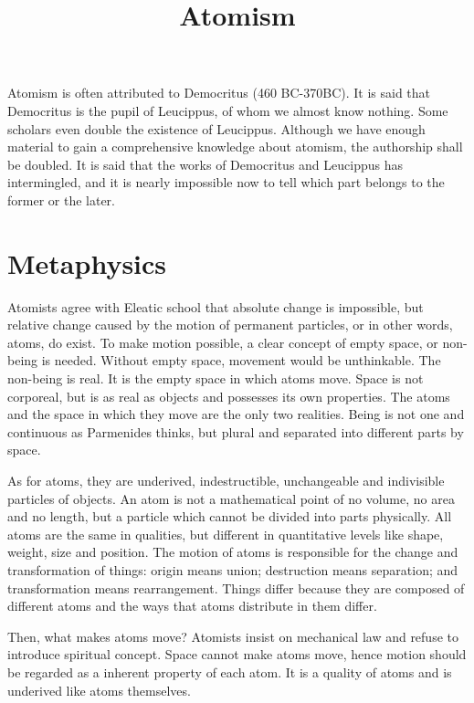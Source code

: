 \documentclass[11pt]{article}
\title{Atomism}
\date{}
\begin{document}
  \maketitle

  \linenumbers
Atomism is often attributed to Democritus (460 BC-370BC). 
It is said that Democritus is the pupil of Leucippus, of whom we almost know nothing. 
Some scholars even double the existence of Leucippus. 
Although we have enough material to gain a comprehensive knowledge about atomism, the authorship shall be doubled. 
It is said that the works of Democritus and Leucippus has intermingled, and it is nearly impossible now to tell which part belongs to the former or the later.

\section{Metaphysics} 
Atomists agree with Eleatic school that absolute change is impossible, but relative change caused by the motion of permanent particles, or in other words, atoms, do exist. 
To make motion possible, a clear concept of empty space, or non-being is needed. 
Without empty space, movement would be unthinkable. 
The non-being is real. 
It is the empty space in which atoms move. 
Space is not corporeal, but is as real as objects and possesses its own properties. 
The atoms and the space in which they move are the only two realities. 
Being is not one and continuous as Parmenides thinks, but plural and separated into different parts by space. 

\newline

As for atoms, they are underived, indestructible, unchangeable and indivisible particles of objects. 
An atom is not a mathematical point of no volume, no area and no length, but a particle which cannot be divided into parts physically. 
All atoms are the same in qualities, but different in quantitative levels like shape, weight, size and position. 
The motion of atoms is responsible for the change and transformation of things: 
origin means union; 
destruction means separation; 
and transformation means rearrangement. 
Things differ because they are composed of different atoms and the ways that atoms distribute in them differ.

\newline

Then, what makes atoms move? 
Atomists insist on mechanical law and refuse to introduce spiritual concept. 
Space cannot make atoms move, hence motion should be regarded as a inherent property of each atom. 
It is a quality of atoms and is underived like atoms themselves.
  
\end{document}
